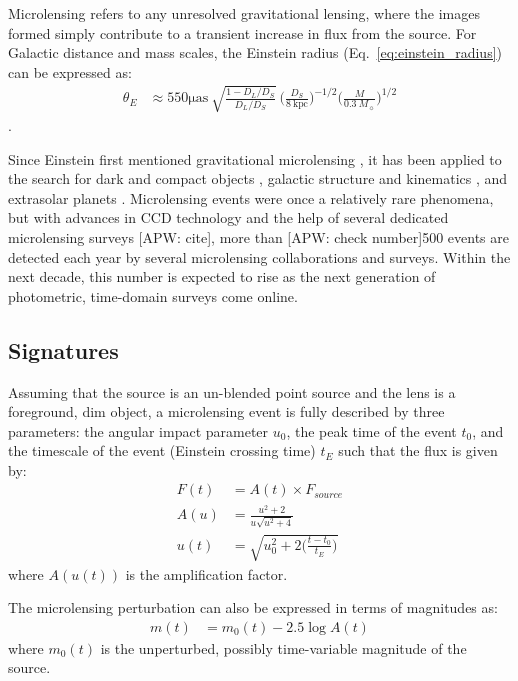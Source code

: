 \documentclass[12pt,preprint]{aastex}
\begin{document}
Microlensing refers to any unresolved gravitational lensing, where the images formed simply contribute to a transient increase in flux from the source. For Galactic distance and mass scales, the Einstein radius (Eq.~\ref{eq:einstein_radius}) can be expressed as:
\begin{align}
	\theta_E &\approx 550\mathrm{\mu as}~\sqrt{\frac{1-D_L/D_S}{D_L/D_S}}~\Big(\frac{D_S}{8~\mathrm{kpc}}\Big)^{-1/2} \Big(\frac{M}{0.3~M_\sun}\Big)^{1/2}
\end{align}
\citep{paczynski1986, gaudi2011}. 

Since Einstein first mentioned gravitational microlensing \citep{einstein1936}, it has been applied to the search for dark and compact objects \citep{original_macho, oslowski2008, sartore2010}, galactic structure and kinematics \citep{binney2000}, and extrasolar planets \citep{gaudi2011}. Microlensing events were once a relatively rare phenomena, but with advances in CCD technology and the help of several dedicated microlensing surveys [APW: cite], more than [APW: check number]500 events are detected each year by several microlensing collaborations and surveys. Within the next decade, this number is expected to rise as the next generation of photometric, time-domain surveys come online.

\subsection{Signatures}
Assuming that the source is an un-blended point source and the lens is a foreground, dim object, a microlensing event is fully described by three parameters: the angular impact parameter $u_0$, the peak time of the event $t_0$, and the timescale of the event (Einstein crossing time) $t_E$ such that the flux is given by:
\begin{align}
	F(t) &= A(t)\times F_{source} \\
	A(u) &= \frac{u^2 + 2}{u\sqrt{u^2 + 4}}\\
	u(t) &= \sqrt{u_0^2 + 2\Big(\frac{t-t_0}{t_E}\Big)}
\end{align}
where $A(u(t))$ is the amplification factor.

The microlensing perturbation can also be expressed in terms of magnitudes as:
\begin{align}
	m(t) &= m_0(t) - 2.5\log A(t)
\end{align}
where $m_0(t)$ is the unperturbed, possibly time-variable magnitude of the source.
\end{document}
